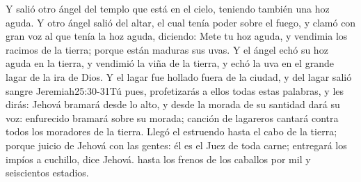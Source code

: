 Y salió otro ángel del templo que está en el cielo, teniendo también una hoz aguda. 
Y otro ángel salió del altar, el cual tenía poder sobre el fuego, y clamó con gran voz al que tenía la hoz aguda, diciendo: Mete tu hoz aguda, y vendimia los racimos de la tierra; porque están maduras sus uvas. 
Y el ángel echó su hoz aguda en la tierra, y vendimió la viña de la tierra, y echó la uva en el grande lagar de la ira de Dios.
Y el lagar fue hollado fuera de la ciudad, y del lagar salió sangre%
				{Jeremiah}{25:30-31}{Tú pues, profetizarás a ellos todas estas palabras, y les dirás: Jehová bramará desde lo alto, y desde la morada de su santidad dará su voz: enfurecido bramará sobre su morada; canción de lagareros cantará contra todos los moradores de la tierra. Llegó el estruendo hasta el cabo de la tierra; porque juicio de Jehová con las gentes: él es el Juez de toda carne; entregará los impíos a cuchillo, dice Jehová.}
 hasta los frenos de los caballos por mil y seiscientos estadios.
